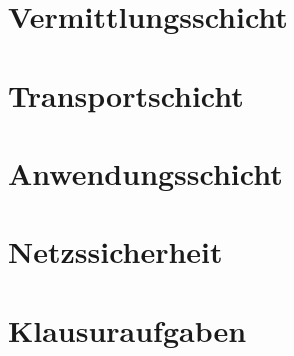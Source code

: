 \documentclass[a4paper, 14pt]{article}
\begin{document}
	\section{Vermittlungsschicht}

	\section{Transportschicht}

	\section{Anwendungsschicht}

	\section{Netzssicherheit}

	\section{Klausuraufgaben}
\end{document}
